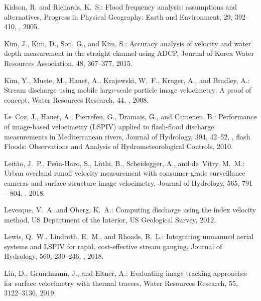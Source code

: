 \documentclass[hess, manuscript]{copernicus} %
\begin{document}
\begin{thebibliography}{70}
Kidson, R. and Richards, K.~S.: Flood frequency analysis: assumptions and
  alternatives, Progress in Physical Geography: Earth and Environment, 29,
  392--410, , 2005.

Kim, J., Kim, D., Son, G., and Kim, S.: Accuracy analysis of velocity and water
  depth measurement in the straight channel using ADCP, Journal of Korea Water
  Resources Association, 48, 367--377, 2015.

Kim, Y., Muste, M., Hauet, A., Krajewski, W.~F., Kruger, A., and Bradley, A.:
  Stream discharge using mobile large-scale particle image velocimetry: A proof
  of concept, Water Resources Research, 44, , 2008.

Le~Coz, J., Hauet, A., Pierrefeu, G., Dramais, G., and Camenen, B.: Performance
  of image-based velocimetry (LSPIV) applied to flash-flood discharge
  measurements in Mediterranean rivers, Journal of Hydrology, 394, 42--52,
  , flash Floods:
  Observations and Analysis of Hydrometeorological Controls, 2010.

Leitão, J.~P., Peña-Haro, S., Lüthi, B., Scheidegger, A., and de~Vitry,
  M.~M.: Urban overland runoff velocity measurement with consumer-grade
  surveillance cameras and surface structure image velocimetry, Journal of
  Hydrology, 565, 791 -- 804,
  , 2018.

Levesque, V.~A. and Oberg, K.~A.: Computing discharge using the index velocity
  method, US Department of the Interior, US Geological Survey, 2012.

Lewis, Q.~W., Lindroth, E.~M., and Rhoads, B.~L.: Integrating unmanned aerial
  systems and LSPIV for rapid, cost-effective stream gauging, Journal of
  Hydrology, 560, 230--246,
  , 2018.

Lin, D., Grundmann, J., and Eltner, A.: Evaluating image tracking approaches
  for surface velocimetry with thermal tracers, Water Resources Research, 55,
  3122--3136, 2019.


\end{thebibliography}
\end{document}
